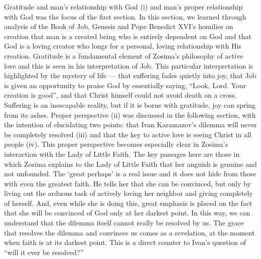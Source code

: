 Gratitude and man's relationship with God (i) and man's proper relationship with God was the focus of the first section. In this section, we learned through analysis of the Book of Job, Genesis and Pope Benedict XVI's homilies on creation that man is a created being who is entirely dependent on God and that God is a loving creator who longs for a personal, loving relationship with His creation. Gratitude is a fundamental element of Zosima's philosophy of active love and this is seen in his interpretation of Job. This particular interpretation is highlighted by the mystery of life --- that suffering fades quietly into joy, that Job is given an opportunity to praise God by essentially saying, ``Look, Lord. Your creation is good'', and that Christ himself could not avoid death on a cross. Suffering is an inescapable reality, but if it is borne with gratitude, joy can spring from its ashes.
 Proper perspective (ii) was discussed in the following section, with the intention of elucidating two points: that Ivan Karamazov's dilemma will never be completely resolved (iii) and that the key to active love is seeing Christ in all people (iv). This proper perspective becomes especially clear in Zosima's interaction with the Lady of Little Faith. The key passages here are those in which Zosima explains to the Lady of Little Faith that her anguish is genuine and not unfounded. The `great perhaps' is a real issue and it does not hide from those with even the greatest faith. He tells her that she can be convinced, but only by living out the arduous task of actively loving her neighbor and giving completely of herself. And, even while she is doing this, great emphasis is placed on the fact that she will be convinced of God only at her darkest point. In this way, we can understand that the dilemma itself cannot really be resolved by us. The grace that resolves the dilemma and convinces us comes as a revelation, at the moment when faith is at its darkest point.  This is a direct counter to Ivan's question of ``will it ever be resolved?'' 
 
